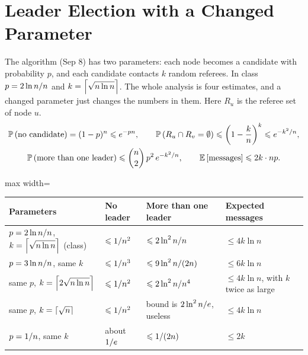 \section{Leader Election with a Changed Parameter}\label{sec:leader}

The algorithm (Sep 8) has two parameters: each node becomes a candidate with probability $p$, and
each candidate contacts $k$ random referees. In class $p = 2 \ln n/n$ and
$k = \left\lceil\sqrt{n \ln n}\right\rceil$. The whole analysis is four estimates, and a changed parameter just
changes the numbers in them. Here $R_u$ is the referee set of node $u$.
\begin{gather*}
    \operatorname{\mathbb{P}}\left(\text{no candidate}\right) = (1-p)^n \leqslant e^{-pn},
    \qquad
    \operatorname{\mathbb{P}}\left(R_u \cap R_v = \emptyset\right) \leqslant \left(1 - \frac{k}{n}\right)^{k} \leqslant e^{-k^2/n}, \\
    \operatorname{\mathbb{P}}\left(\text{more than one leader}\right) \leqslant \binom{n}{2}\, p^2\, e^{-k^2/n},
    \qquad
    \operatorname{\mathbb{E}}\left[\text{messages}\right] \leqslant 2k \cdot np.
\end{gather*}
\begin{center}
    \begin{adjustbox}{max width=\textwidth}
    \begin{tabular}{llll}
        \toprule
        Parameters                                                      & No leader                 & More than one leader                         & Expected messages                         \\ \midrule
        $p = 2 \ln n/n$, $k = \left\lceil\sqrt{n \ln n}\right\rceil$ (class)   & $\leqslant 1/n^2$     & $\leqslant 2 \ln^2 n/n$                  & $\leq 4k \ln n$                           \\
        $p = 3 \ln n/n$, same $k$                              & $\leqslant 1/n^3$     & $\leqslant 9 \ln^2 n/(2n)$               & $\leq 6k \ln n$                           \\
        same $p$, $k = \left\lceil2\sqrt{n \ln n}\right\rceil$                          & $\leqslant 1/n^2$     & $\leqslant 2 \ln^2 n/n^4$                & $\leq 4k \ln n$, with $k$ twice as large  \\
        same $p$, $k = \left\lceil\sqrt{n}\right\rceil$                                 & $\leqslant 1/n^2$     & bound is $2 \ln^2 n/e$, useless     & $\leq 4k \ln n$                           \\
        $p = 1/n$, same $k$                                    & about $1/e$      & $\leqslant 1/(2n)$                       & $\leq 2k$                                 \\ \bottomrule
    \end{tabular}
    \end{adjustbox}
\end{center}

